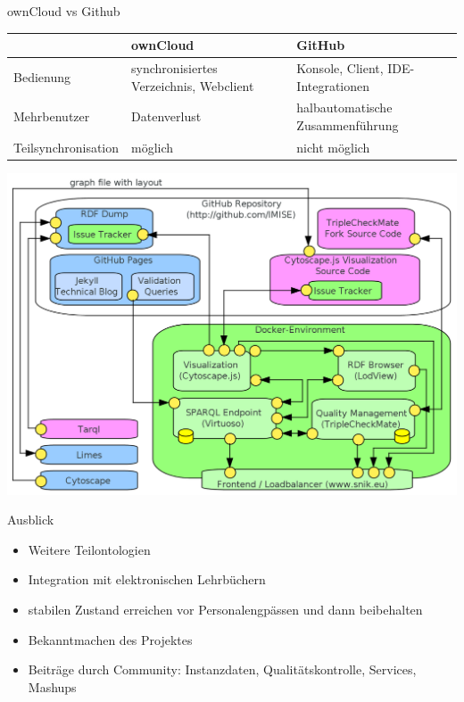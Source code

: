 \documentclass{beamer}
\begin{document}
\begin{frame}{ownCloud vs Github}
\begin{tabulary}{\textwidth}{lLL}
\toprule
			&ownCloud					&GitHub\\
\midrule
Bedienung		&synchronisiertes Verzeichnis, Webclient	&Konsole, Client, IDE-Integrationen\\
Mehrbenutzer		&Datenverlust					&halbautomatische Zusammenführung\\
Teilsynchronisation	&möglich					&nicht möglich\\
\bottomrule
\end{tabulary}
\end{frame}
\fi

\begin{frame}
\includegraphics[width=\textwidth]{img/architecture.png}
\end{frame}

\begin{frame}{Ausblick}
\begin{itemize}
\item Weitere Teilontologien 
\item Integration mit elektronischen Lehrbüchern
\item stabilen Zustand erreichen vor Personalengpässen und dann beibehalten
\item Bekanntmachen des Projektes
\item Beiträge durch Community: Instanzdaten, Qualitätskontrolle, Services, Mashups 
\end{itemize}
\end{frame}
\end{document}
